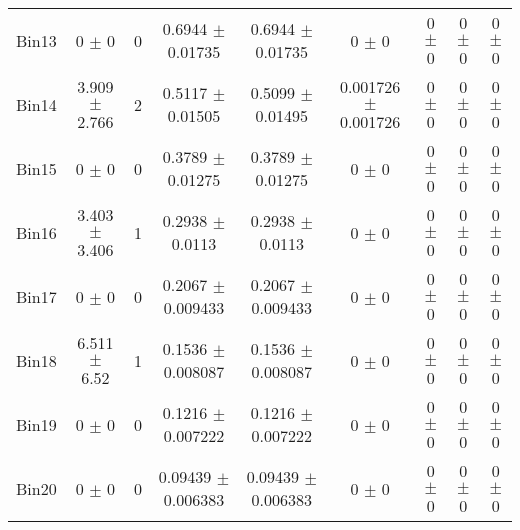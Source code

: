 \begin{tabular}{@{\extracolsep{4pt}}lcccccccc@{}}
     Bin13 & 0 $\pm$ 0 & 0 & 0.6944 $\pm$ 0.01735 & 0.6944 $\pm$ 0.01735 & 0 $\pm$ 0 & 0 $\pm$ 0 & 0 $\pm$ 0 & 0 $\pm$ 0 \\ 
     Bin14 & 3.909 $\pm$ 2.766 & 2 & 0.5117 $\pm$ 0.01505 & 0.5099 $\pm$ 0.01495 & 0.001726 $\pm$ 0.001726 & 0 $\pm$ 0 & 0 $\pm$ 0 & 0 $\pm$ 0 \\ 
     Bin15 & 0 $\pm$ 0 & 0 & 0.3789 $\pm$ 0.01275 & 0.3789 $\pm$ 0.01275 & 0 $\pm$ 0 & 0 $\pm$ 0 & 0 $\pm$ 0 & 0 $\pm$ 0 \\ 
     Bin16 & 3.403 $\pm$ 3.406 & 1 & 0.2938 $\pm$ 0.0113 & 0.2938 $\pm$ 0.0113 & 0 $\pm$ 0 & 0 $\pm$ 0 & 0 $\pm$ 0 & 0 $\pm$ 0 \\ 
     Bin17 & 0 $\pm$ 0 & 0 & 0.2067 $\pm$ 0.009433 & 0.2067 $\pm$ 0.009433 & 0 $\pm$ 0 & 0 $\pm$ 0 & 0 $\pm$ 0 & 0 $\pm$ 0 \\ 
     Bin18 & 6.511 $\pm$ 6.52 & 1 & 0.1536 $\pm$ 0.008087 & 0.1536 $\pm$ 0.008087 & 0 $\pm$ 0 & 0 $\pm$ 0 & 0 $\pm$ 0 & 0 $\pm$ 0 \\ 
     Bin19 & 0 $\pm$ 0 & 0 & 0.1216 $\pm$ 0.007222 & 0.1216 $\pm$ 0.007222 & 0 $\pm$ 0 & 0 $\pm$ 0 & 0 $\pm$ 0 & 0 $\pm$ 0 \\ 
     Bin20 & 0 $\pm$ 0 & 0 & 0.09439 $\pm$ 0.006383 & 0.09439 $\pm$ 0.006383 & 0 $\pm$ 0 & 0 $\pm$ 0 & 0 $\pm$ 0 & 0 $\pm$ 0 \\ 
\hline\hline
  \end{tabular}
